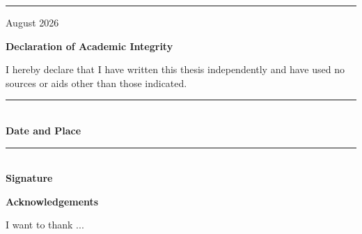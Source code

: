 \vfill

\begin{center}
    \rule{12cm}{0.4pt}
    \vspace{0.3cm}
    
    {\large August 2026 \par}
    \vspace{0.2cm}
    {\small \par}
\end{center}



\newpage
\thispagestyle{plain}
\vspace*{1cm} 

\begin{center}
    {\Large\bfseries Declaration of Academic Integrity \par}
\end{center}

\vspace{1.5cm}

\noindent
I hereby declare that I have written this thesis independently and have used no sources or aids
other than those indicated.
\vspace{2cm} 

\noindent
\begin{minipage}[t]{0.45\textwidth}
    \raggedright
    \rule{6.5cm}{0.4pt} \\
    \vspace{0.1cm}
    {\normalsize\bfseries Date and Place}
\end{minipage}%
\hfill
\begin{minipage}[t]{0.45\textwidth}
    \raggedleft
    \rule{6.5cm}{0.4pt} \\
    \vspace{0.1cm}
    {\normalsize\bfseries Signature}
\end{minipage}%

\vspace{4cm}

\begin{center}
    {\Large\bfseries Acknowledgements \par}
\end{center}

\vspace{1.5cm}

\noindent
I want to thank ...


\vfill

\endgroup 
\newpage


